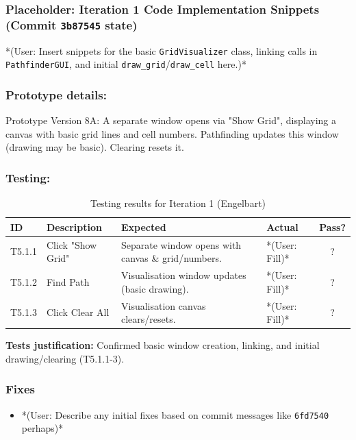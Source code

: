 \newpage
\subsubsection*{Placeholder: Iteration 1 Code Implementation Snippets (Commit \verb|3b87545| state)}
*(User: Insert snippets for the basic \verb|GridVisualizer| class, linking calls in \verb|PathfinderGUI|, and initial \verb|draw_grid|/\verb|draw_cell| here.)*
\newpage

\subsubsection{Prototype details:}
Prototype Version 8A: A separate window opens via "Show Grid", displaying a canvas with basic grid lines and cell numbers. Pathfinding updates this window (drawing may be basic). Clearing resets it.

\subsubsection{Testing:}
\begin{table}[htbp]
	\centering
	\begin{tabularx}{\textwidth}{|l|X|p{4.5cm}|p{1.5cm}|c|}
		\hline
		\textbf{ID} & \textbf{Description} & \textbf{Expected} & \textbf{Actual} & \textbf{Pass?} \\
		\hline
		T5.1.1 & Click "Show Grid" & Separate window opens with canvas \& grid/numbers. & *(User: Fill)* & ? \\
		\hline
		T5.1.2 & Find Path & Visualisation window updates (basic drawing). & *(User: Fill)* & ? \\
		\hline
		T5.1.3 & Click Clear All & Visualisation canvas clears/resets. & *(User: Fill)* & ? \\
		\hline
	\end{tabularx}
	\caption{Testing results for Iteration 1 (Engelbart)}
\end{table}
\textbf{Tests justification:} Confirmed basic window creation, linking, and initial drawing/clearing (T5.1.1-3).

\subsubsection{Fixes}
\begin{itemize}
	\item *(User: Describe any initial fixes based on commit messages like \verb|6fd7540| perhaps)*
\end{itemize}

